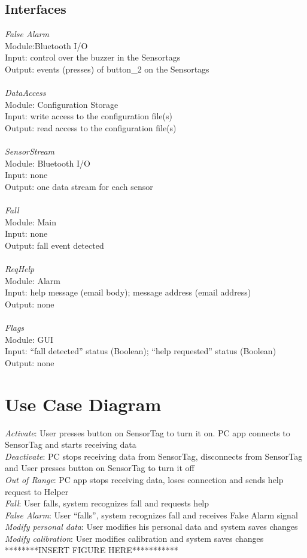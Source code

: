 \documentclass[conference,12pt]{IEEETran}
\begin{document}
\subsection{Interfaces}
\textit{False Alarm}
\\Module:Bluetooth I/O
\\Input: control over the buzzer in the Sensortags
\\Output: events (presses) of button\_2 on the Sensortags
\\\\\textit{DataAccess}
\\Module: Configuration Storage
\\Input: write access to the configuration file(s)
\\Output: read access to the configuration file(s)
\\\\\textit{SensorStream}
\\Module: Bluetooth I/O
\\Input: none
\\Output: one data stream for each sensor
\\\\\textit{Fall}
\\Module: Main
\\Input: none
\\Output: fall event detected
\\\\\textit{ReqHelp}
\\Module: Alarm
\\Input: help message (email body); message address (email address)
\\Output: none
\\\\\textit{Flags}
\\Module: GUI
\\Input: “fall detected” status (Boolean); “help requested” status (Boolean)
\\Output: none

\section{Use Case Diagram}
\textit{Activate}: User presses button on SensorTag to turn it on. PC app connects to SensorTag and starts receiving data\\
\textit{Deactivate}: PC stops receiving data from SensorTag, disconnects from SensorTag and User presses button on SensorTag to turn it off\\
\textit{Out of Range}: PC app stops receiving data, loses connection and sends help request to Helper\\
\textit{Fall}: User falls, system recognizes fall and requests help\\
\textit{False Alarm}: User “falls”, system recognizes fall and receives False Alarm signal\\
\textit{Modify personal data}: User modifies his personal data and system saves changes\\
\textit{Modify calibration}:  User modifies calibration and system saves changes\\
********INSERT FIGURE HERE***********
\end{document}
